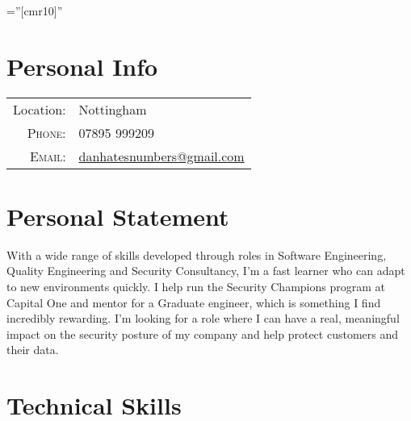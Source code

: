 \documentclass[a4paper,10pt]{article} %
\begin{document}
\pagestyle{empty} %

\font\fb=''[cmr10]'' %


\par{\bigskip\par} %

\section{Personal Info}

\begin{tabular}{rl}
Location: & Nottingham \\
\textsc{Phone:} & 07895 999209\\
\textsc{Email:} & \href{mailto:danhatesnumbers@gmail.com}{danhatesnumbers@gmail.com}
\end{tabular}


\section{Personal Statement}
With a wide range of skills developed through roles in Software Engineering, Quality Engineering and Security Consultancy, I'm a fast learner who can adapt to new environments quickly. I help run the Security Champions program at Capital One and mentor for a Graduate engineer, which is something I find incredibly rewarding.  I'm looking for a role where I can have a real, meaningful impact on the security posture of my company and help protect customers and their data.


\section{Technical Skills}
\end{document}
